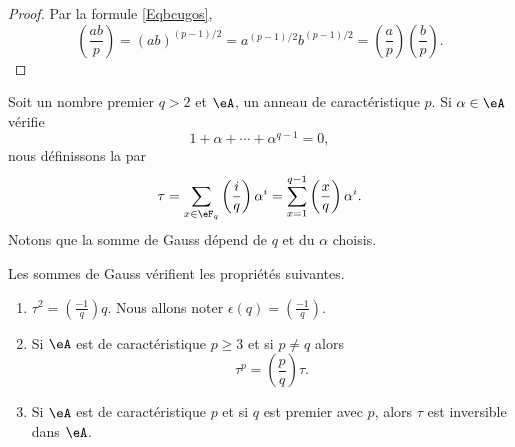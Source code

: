 \begin{proof}
	Par la formule \eqref{Eqbcugos},
	\begin{equation}
		\left(\frac{ab}{p}\right)=(ab)^{(p-1)/2}=a^{(p-1)/2}b^{(p-1)/2}=\left(\frac{a}{p}\right)\left(\frac{b}{p}\right).
	\end{equation}
\end{proof}

Soit un nombre premier \( q>2\) et \( \eA\), un anneau de caractéristique \( p\). Si \( \alpha\in \eA\) vérifie
\begin{equation}
	1+\alpha+\cdots+\alpha^{q-1}=0,
\end{equation}
nous définissons la  par
\begin{equation}
	\tau=\sum_{x\in \eF_q}\left(\frac{i}{q}\right)\alpha^i=\sum_{x=1}^{q-1}\left(\frac{x}{q}\right)\alpha^i.
\end{equation}
Notons que la somme de Gauss dépend de \( q\) et du \( \alpha\) choisis.

\begin{proposition} \label{PropciRUov}
	Les sommes de Gauss vérifient les propriétés suivantes.
	\begin{enumerate}
		\item
		      \( \tau^2=\left(\frac{-1}{q}\right)q\). Nous allons noter \( \epsilon(q)=\left(\frac{-1}{q}\right)\).
		\item
		      Si \( \eA\) est de caractéristique \( p\geq 3\) et si \( p\neq q\) alors
		      \begin{equation}    \label{EqxBNpJz}
			      \tau^p=\left(\frac{p}{q}\right)\tau.
		      \end{equation}
		\item
		      Si \( \eA\) est de caractéristique \( p\) et si \( q\) est premier avec \( p\), alors \( \tau\) est inversible dans \( \eA\).
	\end{enumerate}
\end{proposition}

